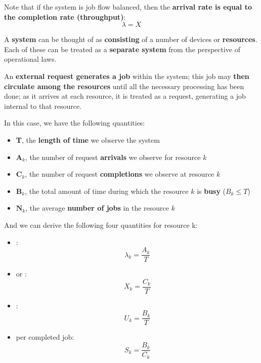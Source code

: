 \highspace
Note that if the system is job flow balanced, then the \textbf{arrival rate is equal to the completion rate (throughput)}:
\begin{equation*}
	\lambda = X
\end{equation*}

\highspace
A \textbf{system} can be thought of as \textbf{consisting} of a number of devices or \textbf{resources}. Each of these can be treated as a \textbf{separate system} from the perspective of operational laws.

\highspace
An \textbf{external request generates a job} within the system; this job may \textbf{then circulate among the resources} until all the necessary processing has been done; as it arrives at each resource, it is treated as a request, generating a job internal to that resource.

\highspace
In this case, we have the following quantities:
\begin{itemize}
	\item \textbf{T}, the \textbf{length of time} we observe the system
	\item $\mathbf{A}_{k}$, the number of request \textbf{arrivals} we observe for resource $k$
	\item $\mathbf{C}_{k}$, the number of request \textbf{completions} we observe at resource $k$
	\item $\mathbf{B}_{k}$, the total amount of time during which the resource $k$ is \textbf{busy} ($B_{k} \le T$)
	\item $\mathbf{N}_{k}$, the average \textbf{number of jobs} in the resource $k$
\end{itemize}
And we can derive the following four quantities for resource k:
\begin{itemize}
	\item {}:
	\begin{equation}
		\lambda_{k} = \dfrac{A_{k}}{T}
	\end{equation}
	
	\item {} or :
	\begin{equation}
		X_{k} = \dfrac{C_{k}}{T}
	\end{equation}
	
	\item {}:
	\begin{equation}
		U_{k} = \dfrac{B_{k}}{T}
	\end{equation}
	
	\item {} per completed job:
	\begin{equation}
		S_{k} = \dfrac{B_{k}}{C_{k}}
	\end{equation}
\end{itemize}

